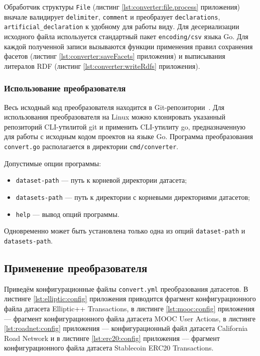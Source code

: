 Обработчик структуры \texttt{File} (листинг \ref{lst:converter:file.process} приложения) вначале валидирует
\texttt{delimiter}, \texttt{comment} и преобразует \texttt{declarations}, \texttt{artificial\_declaration} к
удобному для работы виду. Для десериализации исходного файла используется стандартный пакет \texttt{encoding/csv}
языка Go. Для каждой полученной записи вызываются функции применения правил сохранения фасетов (листинг
\ref{lst:converter:saveFacets} приложения) и выписывания литералов RDF (листинг \ref{lst:converter:writeRdfs}
приложения). 


\subsubsection{Использование преобразователя}

Весь исходный код преобразователя находится в Git-репозитории~\cite{sources}. Для использования
преобразователя на Linux можно клонировать указанный репозиторий CLI-утилитой git и
применить CLI-утилиту go, предназначенную для работы с исходным кодом проектов на языке Go.
Программа преобразования \texttt{convert.go} располагается в директории \texttt{cmd/converter}.

Допустимые опции программы:
\begin{itemize}
    \item \texttt{dataset-path} --- путь к корневой директории датасета;
    \item \texttt{datasets-path} --- путь к директории с корневыми директориями датасетов;
    \item \texttt{help} --- вывод опций программы.
\end{itemize}
Одновременно может быть установлена только одна из опций \texttt{dataset-path} и \texttt{datasets-path}.



\subsection{Применение преобразователя}

Приведём конфигурационные файлы \texttt{convert.yml} преобразования датасетов. В листинге \ref{lst:elliptic:config}
приложения приводится фрагмент конфигурационного файла датасета Elliptic++ Transactions, в листинге
\ref{lst:mooc:config} приложения --- фрагмент конфигурационного файла датасета MOOC User Actions, в листинге
\ref{lst:roadnet:config} приложения --- конфигурационный файл датасета California Road Network и в листинге
\ref{lst:erc20:config} приложения --- фрагмент конфигурационного файла датасета Stablecoin ERC20 Transactions.



